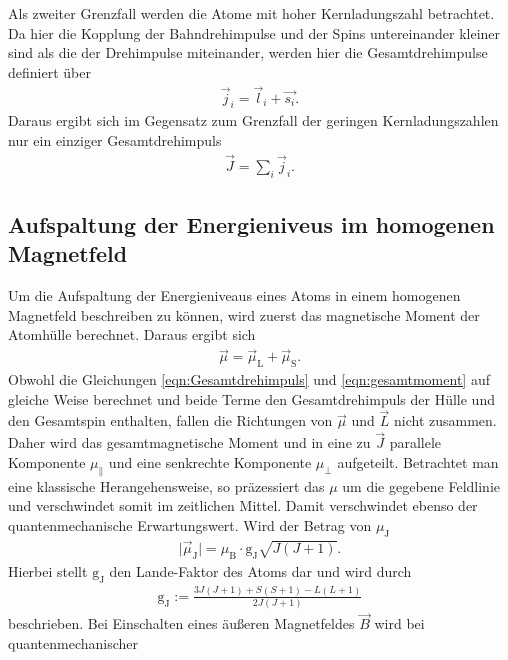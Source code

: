 Als zweiter Grenzfall werden die Atome mit hoher Kernladungszahl betrachtet.
Da hier die Kopplung der Bahndrehimpulse und der Spins untereinander kleiner sind
als die der Drehimpulse miteinander, werden hier die Gesamtdrehimpulse definiert
über
\begin{align}
  \vec{j}_i = \vec{l}_i + \vec{s_i}.
  \label{eqn:gesamt}
\end{align}
Daraus ergibt sich im Gegensatz zum Grenzfall der geringen Kernladungszahlen nur
ein einziger Gesamtdrehimpuls
\begin{align}
  \vec{J} = \sum_i \vec{j}_i.
  \label{eqn:Gesamtdrehimpuls}
\end{align}

\subsection{Aufspaltung der Energieniveus im homogenen Magnetfeld}
\label{sec:aufspaltung}
Um die Aufspaltung der Energieniveaus eines Atoms in einem homogenen Magnetfeld
beschreiben zu können, wird zuerst das magnetische Moment der Atomhülle berechnet.
Daraus ergibt sich
\begin{align}
  \vec{\mu} = \vec{\mu}_\text{L} + \vec{\mu}_\text{S}.
  \label{eqn:gesamtmoment}
\end{align}
Obwohl die Gleichungen \ref{eqn:Gesamtdrehimpuls} und \ref{eqn:gesamtmoment}
auf gleiche Weise berechnet und beide Terme den Gesamtdrehimpuls der Hülle und
den Gesamtspin enthalten, fallen die Richtungen von $\vec{\mu}$ und $\vec{L}$
nicht zusammen. Daher wird das gesamtmagnetische Moment und in eine zu $\vec{J}$
parallele Komponente $\mu_{\parallel}$ und eine senkrechte Komponente $\mu_{\bot}$
aufgeteilt. Betrachtet man eine klassische Herangehensweise, so präzessiert das
$\mu$ um die gegebene Feldlinie und verschwindet somit im zeitlichen Mittel. Damit
verschwindet ebenso der quantenmechanische Erwartungswert. Wird der Betrag von
$\mu_\text{J}$
\begin{align}
  \mid \vec{\mu}_\text{J} \mid = \mu_\text{B}\cdot \text{g}_\text{J} \sqrt{J\left(J+1 \right)}.
\end{align}
Hierbei stellt $\text{g}_\text{J}$ den Lande-Faktor des Atoms dar und wird durch
\begin{align}
  \text{g}_\text{J} := \frac{3J\left(J+1 \right) + S\left(S+1 \right) - L\left(L+1 \right)}{2J\left(J+1 \right)}
  \label{eqn:lande}
\end{align}
beschrieben.
Bei Einschalten eines äußeren Magnetfeldes $\vec{B}$ wird bei quantenmechanischer
